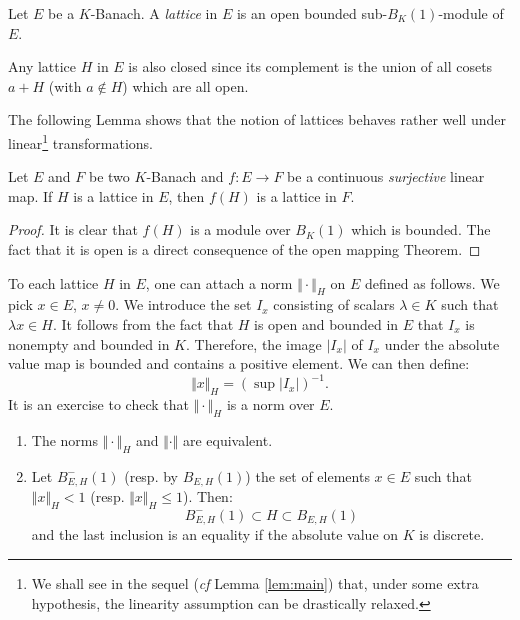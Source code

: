 \documentclass{lms}
\begin{document}
\begin{deftn}
Let $E$ be a $K$-Banach.
A \emph{lattice} in $E$ is an open bounded sub-$B_K(1)$-module of $E$.
\end{deftn}

\begin{rmk}
Any lattice $H$ in $E$ is also closed since its complement is the
union of all cosets $a + H$ (with $a \not\in H$) which are all open.
\end{rmk}

The following Lemma shows that the notion of lattices behaves rather 
well under linear\footnote{We shall see in the sequel (\emph{cf} Lemma 
\ref{lem:main}) that, under some extra hypothesis, the linearity 
assumption can be drastically relaxed.} transformations.

\begin{lem}
\label{lem:morlat}
Let $E$ and $F$ be two $K$-Banach and $f : 
E \to F$ be a continuous \emph{surjective} linear map.
If $H$ is a lattice in $E$, then $f(H)$ is a lattice in $F$.
\end{lem}

\begin{proof}
It is clear that $f(H)$ is a module over $B_K(1)$ which is bounded.
The fact that it is open is a direct consequence of the open mapping
Theorem.
\end{proof}

To each lattice $H$ in $E$, one can attach a norm $\Vert \cdot \Vert_H$ 
on $E$ defined as follows. We pick $x \in E$, $x \neq 0$. We introduce
the set $I_x$ consisting of scalars $\lambda \in K$ such that $\lambda x 
\in H$. It follows from the fact that $H$ is open and bounded in $E$
that $I_x$ is nonempty and bounded in $K$. Therefore, the image $|I_x|$ 
of $I_x$ under the absolute value map is bounded and contains a positive
element. We can then define:
$$\Vert x \Vert_H = (\sup |I_x|)^{-1}.$$
It is an exercise to check that $\Vert \cdot \Vert_H$ is a norm over 
$E$.

\begin{lem} \label{lem:reductionball}
\begin{enumerate}
\item The norms $\Vert \cdot \Vert_H$ and $\Vert \cdot \Vert$ are 
equivalent.
\item Let $B^-_{E,H}(1)$ (resp. by $B_{E,H}(1)$) the set of elements $x 
\in E$ such that $\Vert x \Vert_H < 1$ (resp. $\Vert x \Vert_H \leq 1$).
Then:
$$B^-_{E,H}(1) \subset H \subset B_{E,H}(1)$$
and the last inclusion is an equality if the absolute value on $K$ is
discrete.
\end{enumerate}
\end{lem}
\end{document}
